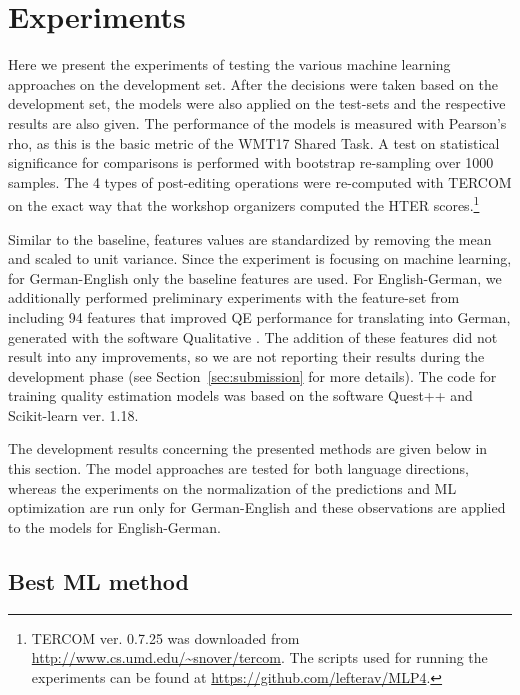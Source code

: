 \documentclass[11pt,letterpaper]{article}
\begin{document}
\section{Experiments}
\label{sec:experiment}

Here we present the experiments of testing the various machine learning
approaches on the development set. After the decisions were taken based on the
development set, the models were also applied on the test-sets and the
respective results are also given.
The performance of the models is measured with Pearson's rho, as this is the
basic metric of the WMT17 Shared Task.
A test on statistical significance for comparisons is performed with bootstrap
re-sampling over 1000 samples.
The 4 types of post-editing operations were re-computed with TERCOM on the exact
way that the workshop organizers computed the HTER scores.\footnote{TERCOM ver.
0.7.25 was downloaded from \url{http://www.cs.umd.edu/~snover/tercom}. The
scripts used for running the experiments can be found at
\url{https://github.com/lefterav/MLP4}.}

Similar to the baseline, features values are standardized by removing the mean
and scaled to unit variance. Since the experiment is focusing on machine
learning, for German-English only the baseline features are used.
For English-German, we additionally performed preliminary experiments with the
feature-set from \citet{pub9044} including 94 features that improved QE
performance for translating into German, generated with the software Qualitative
\cite{pub8768}.
The addition of these features did not result into any improvements, so we are
not reporting their results during the development phase (see
Section~\ref{sec:submission} for more details).
The code for training quality estimation models was based on the software
Quest++
\cite{specia-paetzold-scarton:2015:ACL-IJCNLP-2015-System-Demonstrations} and
Scikit-learn \cite{scikit-learn} ver. 1.18.

The development results concerning the presented methods are given below in
this section. The model approaches are tested for both language directions,
whereas the experiments on the normalization of the predictions and ML
optimization are run only for German-English and these observations are applied 
to the models for English-German.

\subsection{Best ML method}
\end{document}
